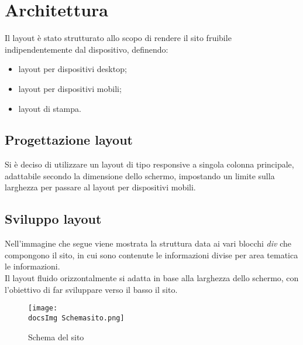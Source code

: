 \section{Architettura}{
	Il layout è stato strutturato allo scopo di rendere il sito fruibile indipendentemente dal dispositivo, definendo:
	\begin{itemize}\itemsep1pt
		\item layout per dispositivi desktop;
		\item layout per dispositivi mobili;
		\item layout di stampa.
	\end{itemize} 
	
	\subsection{Progettazione layout}{
		Si è deciso di utilizzare un layout di tipo responsive a singola colonna principale, adattabile secondo la dimensione dello schermo, impostando un limite sulla larghezza per passare al layout per dispositivi mobili.
	}
	\subsection{Sviluppo layout}{
		Nell'immagine che segue viene mostrata la struttura data ai vari blocchi \textit{div} che compongono il sito, in cui sono contenute le informazioni divise per area tematica le informazioni.
	\\
	Il layout fluido orizzontalmente si adatta in base alla larghezza dello schermo, con l'obiettivo di far sviluppare verso il basso il sito.
		\begin{figure}[H]
			\texttt{[image: \\docsImg Schemasito.png]}
			\caption{Schema del sito}
			\label{Schema del sito}
		\end{figure}
		
}}

